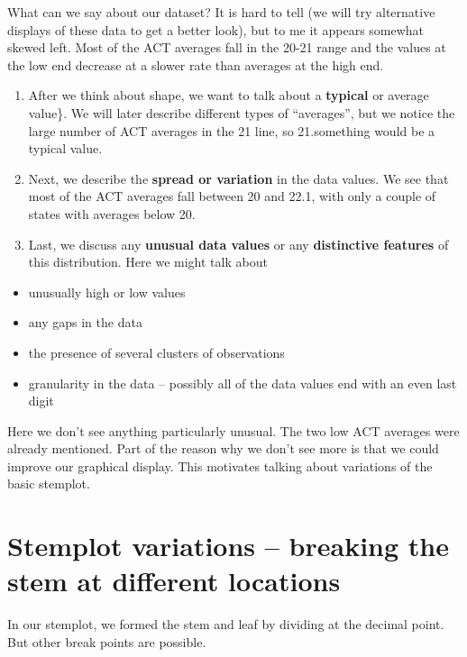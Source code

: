 \documentclass[
]{book}
\providecommand{\tightlist}{%
  \setlength{\itemsep}{0pt}\setlength{\parskip}{0pt}}
\begin{document}
What can we say about our dataset? It is hard to tell (we will try alternative displays of these data to get a better look), but to me it appears somewhat skewed left. Most of the ACT averages fall in the 20-21 range and the values at the low end decrease at a slower rate than averages at the high end.

\begin{enumerate}
\def\labelenumi{\arabic{enumi}.}
\setcounter{enumi}{1}
\item
  After we think about shape, we want to talk about a \textbf{typical} or average value\}. We will later describe different types of ``averages'', but we notice the large number of ACT averages in the 21 line, so 21.something would be a typical value.
\item
  Next, we describe the \textbf{spread or variation} in the data values. We see that most of the ACT averages fall between 20 and 22.1, with only a couple of states with averages below 20.
\item
  Last, we discuss any \textbf{unusual data values} or any \textbf{distinctive features} of this distribution. Here we might talk about
\end{enumerate}

\begin{itemize}
\tightlist
\item
  unusually high or low values
\item
  any gaps in the data
\item
  the presence of several clusters of observations
\item
  granularity in the data -- possibly all of the data values end with an even last digit
\end{itemize}

Here we don't see anything particularly unusual. The two low ACT averages were already mentioned. Part of the reason why we don't see more is that we could improve our graphical display. This motivates talking about variations of the basic stemplot.

\hypertarget{stemplot-variations-breaking-the-stem-at-different-locations}{%
\section{Stemplot variations -- breaking the stem at different locations}\label{stemplot-variations-breaking-the-stem-at-different-locations}}

In our stemplot, we formed the stem and leaf by dividing at the decimal point. But other break points are possible.
\end{document}
